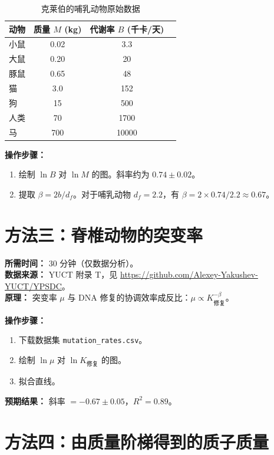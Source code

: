 \documentclass[12pt,a4paper]{article}
\begin{document}
	\begin{table}[H]
		\centering
		\caption{克莱伯的哺乳动物原始数据}
		\label{tab:kleiber}
		\begin{tabular}{l c c c}
			\toprule
			动物 & 质量 \(M\) (kg) & 代谢率 \(B\) (千卡/天) \\
			\midrule
			小鼠   & 0.02   & 3.3 \\
			大鼠   & 0.20   & 20 \\
			豚鼠   & 0.65   & 48 \\
			猫     & 3.0    & 152 \\
			狗     & 15     & 500 \\
			人类   & 70     & 1700 \\
			马     & 700    & 10000 \\
			\bottomrule
		\end{tabular}
	\end{table}
	
	\textbf{操作步骤：}
	\begin{enumerate}[label=(\arabic*)]
		\item 绘制 \(\ln B\) 对 \(\ln M\) 的图。斜率约为 \(0.74 \pm 0.02\)。
		\item 提取 \(\beta = 2b / d_f\)。对于哺乳动物 \(d_f = 2.2\)，有 \(\beta = 2 \times 0.74 / 2.2 \approx 0.67\)。
	\end{enumerate}
	
	\section{方法三：脊椎动物的突变率}
	\label{sec:mutation}
	
	\textbf{所需时间：} 30 分钟（仅数据分析）。\\
	\textbf{数据来源：} YUCT 附录 T，见 \url{https://github.com/Alexey-Yakushev-YUCT/YPSDC}。\\
	\textbf{原理：} 突变率 \(\mu\) 与 DNA 修复的协调效率成反比：\(\mu \propto K_{\text{修复}}^{-\beta}\)。
	
	\textbf{操作步骤：}
	\begin{enumerate}[label=(\arabic*)]
		\item 下载数据集 \texttt{mutation\_rates.csv}。
		\item 绘制 \(\ln \mu\) 对 \(\ln K_{\text{修复}}\) 的图。
		\item 拟合直线。
	\end{enumerate}
	
	\textbf{预期结果：} 斜率 \(= -0.67 \pm 0.05\)，\(R^2 = 0.89\)。
	
	\section{方法四：由质量阶梯得到的质子质量}
	\label{sec:proton}
	
\end{document}
